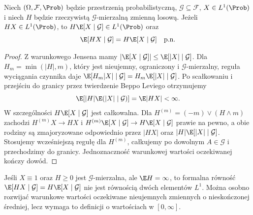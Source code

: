 \begin{twierdzenie}
Niech $(\Omega,\mathcal F,\Prob)$ będzie przestrzenią probabilistyczną,
$\mathcal G\subseteq\mathcal F$, $X\in L^1(\Prob)$ i niech $H$
będzie rzeczywistą $\mathcal G$-mierzalną zmienną losową. Jeżeli
$HX\in L^1(\Prob)$, to $H\E[X\mid\mathcal G]\in L^1(\Prob)$ oraz
\[
\E[HX\mid\mathcal G]=H\E[X\mid\mathcal G]\quad\text{p.n.}
\]
\end{twierdzenie}
\begin{proof}
Z warunkowego Jensena mamy
$|\E[X\mid\mathcal G]|\leq \E[|X|\mid\mathcal G]$.
Dla $H_m=\min(|H|,m)$, który jest nieujemny, ograniczony
i $\mathcal G$-mierzalny, reguła wyciągania czynnika daje
$\E[H_m|X|\mid\mathcal G]=H_m\E[|X|\mid\mathcal G]$.
Po scałkowaniu i przejściu do granicy przez twierdzenie
Beppo Leviego otrzymujemy
\[
\E[|H|\E(|X|\mid\mathcal G)]=\E|HX|<\infty.
\]
W szczególności $H\E[X\mid\mathcal G]$ jest całkowalna.
Dla $H^{(m)}=(-m)\vee(H\wedge m)$ zachodzi
$H^{(m)}X\to HX$ i $H^{(m)}\E[X\mid\mathcal G]\to
H\E[X\mid\mathcal G]$ prawie na pewno, a obie rodziny
są zmajoryzowane odpowiednio przez $|HX|$ oraz
$|H|\E[|X|\mid\mathcal G]$. Stosujemy wcześniejszą
regułę dla $H^{(m)}$, całkujemy po dowolnym $A\in\mathcal G$
i przechodzimy do granicy. Jednoznaczność warunkowej
wartości oczekiwanej kończy dowód.
\end{proof}

\begin{przyklad}
Jeśli $X\equiv1$ oraz $H\geq0$ jest $\mathcal G$-mierzalna,
ale $\E H=\infty$, to formalna równość
$\E[HX\mid\mathcal G]=H\E[X\mid\mathcal G]$
nie jest równością dwóch elementów $L^1$.
Można osobno rozwijać warunkowe wartości oczekiwane
nieujemnych zmiennych o nieskończonej średniej,
lecz wymaga to definicji o wartościach w $[0,\infty]$.
\end{przyklad}

